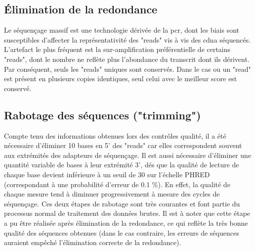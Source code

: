 \documentclass[../main.tex]{subfiles}
\begin{document}
\subsection{Élimination de la redondance}
Le séquençage massif est une technologie dérivée de la \gls{pcr}, dont les biais sont susceptibles d'affecter la représentativité des "reads" vis à vis des \gls{cdna} séquencés.
L'artefact le plus fréquent est la sur-amplification préférentielle de certains "reads", dont le nombre ne reflète plus l'abondance du transcrit dont ils dérivent.
Par conséquent, seuls les "reads" uniques sont conservés.
Dans le cas ou un "read" est présent en plusieurs copies identiques, seul celui avec le meilleur score est conservé.

\subsection{Rabotage des séquences ("trimming")}
Compte tenu des informations obtenues lors des contrôles qualité, il a été nécessaire d'éliminer 10 bases en 5’ des "reads" car elles correspondent souvent aux extrémités des adapteurs de séquençage.
Il est aussi nécessaire d'éliminer une quantité variable de bases à leur extrémité 3', dés que la qualité de lecture de chaque base devient inférieure à un seuil de 30 sur l'échelle PHRED (correspondant à une probabilité d'erreur de 0.1 \%).
En effet, la qualité de chaque mesure tend à diminuer progressivement à mesure des cycles de séquençage.
Ces deux étapes de rabotage sont très courantes et font partie du processus normal de traitement des données brutes.
Il est à noter que cette étape a pu être réalisée après élimination de la redondance, ce qui reflète la très bonne qualité des séquences obtenues (dans le cas contraire, les erreurs de séquences auraient empêché l'élimination correcte de la redondance).
\end{document}
